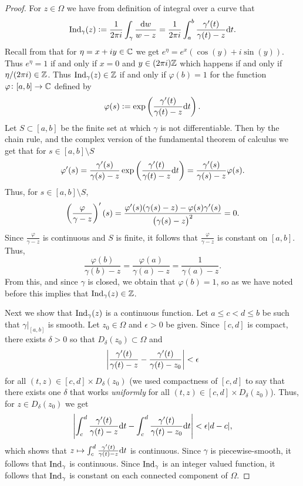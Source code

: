 \documentclass[11pt,a4paper]{article}
\begin{document}
\begin{proof}
  For $z \in \Omega$ we have from definition of integral over a curve
  that
  \[
    \operatorname{Ind}_{\gamma}(z) :=
    \frac{1}{2 \pi i} \int_{\gamma} \frac{\mathrm{d} w}{w - z} =
    \frac{1}{2 \pi i} \int_{a}^{b} \frac{\gamma'(t)}{\gamma(t) - z} \mathrm{d} t.
  \]
  Recall from  that
  for $\eta = x + iy \in \mathbb{C}$ we get $e^{\eta} = e^x (\cos(y) + i \sin(y))$.
  Thus  $e^{\eta} = 1$ if and only if $x = 0$ and $y \in (2\pi i)\mathbb{Z}$ 
  which happens if and only if $\eta / (2\pi i) \in \mathbb{Z}$.
  Thus $\operatorname{Ind}_{\gamma}(z) \in \mathbb{Z}$ if and only if $\varphi(b) = 1$
  for the function $\varphi \colon [a,b] \to \mathbb{C}$ defined by
  \[
    \varphi(s) := \exp\del{\frac{\gamma'(t)}{\gamma(t) - z} \dt}.
  \]
  Let $S \subset [a,b]$ be the finite set at which $\gamma$ is not
  differentiable.
  Then by the chain rule, and the complex version of the
  fundamental theorem of calculus we get that for $s \in [a,b] \setminus S$
  \[
    \varphi'(s) =
    \frac{\gamma'(s)}{\gamma(s) - z}
      \exp\del{\frac{\gamma'(t)}{\gamma(t) - z} \dt} =
    \frac{\gamma'(s)}{\gamma(s) - z} \varphi(s).
  \]
  Thus, for $s \in [a,b] \setminus S$,
  \[
    \del{\frac{\varphi}{\gamma - z}}'(s) =
    \frac{\varphi'(s)(\gamma(s) - z) - \varphi(s) \gamma'(s)}{\del{\gamma(s) - z}^2} = 0.
  \]
  Since $\frac{\varphi}{\gamma - z}$ is continuous and $S$ is finite,
  it follows that $\frac{\varphi}{\gamma - z}$ is constant on $[a,b]$.
  Thus,
  \[
    \frac{\varphi(b)}{\gamma(b) - z} =
    \frac{\varphi(a)}{\gamma(a) - z} =
    \frac{1}{\gamma(a) - z}.
  \]
  From this, and since $\gamma$ is closed, we obtain that $\varphi(b) = 1$,
  so as we have noted before this implies that $\operatorname{Ind}_{\gamma}(z) \in \mathbb{Z}$.

  Next we show that $\operatorname{Ind}_{\gamma}(z)$ is a continuous function.
  Let $a \le c < d \le b$ be such that $\gamma\vert_{[a,b]}$ is smooth.
  Let $z_0 \in \Omega$ and $\epsilon > 0$ be given.
  Since $[c,d]$ is compact, there exists $\delta > 0$ so that
  $D_{\delta}(z_0) \subset \Omega$ and
  \[
    \left\lvert\frac{\gamma'(t)}{\gamma(t) - z} - \frac{\gamma'(t)}{\gamma(t) - z_0}\right\rvert
    < \epsilon
  \]
  for all $(t,z) \in [c,d] \times D_{\delta}(z_0)$
  (we used compactness of $[c,d]$ to say that there exists one $\delta$
  that works \textit{uniformly}
  for all $(t,z) \in [c,d] \times D_{\delta}(z_0)$).
  Thus, for $z \in D_{\delta}(z_0)$ we get
  \[
    \left\lvert\int_{c}^{d} \frac{\gamma'(t)}{\gamma(t) - z} \mathrm{d} t -
    \int_{c}^{d} \frac{\gamma'(t)}{\gamma(t) - z_0} \mathrm{d} t\right\rvert < \epsilon |d - c|,
  \]
  which shows that $z \mapsto \int_{c}^{d} \frac{\gamma'(t)}{\gamma(t) - z} \mathrm{d} t$ is continuous.
  Since $\gamma$ is piecewise-smooth, it follows that $\operatorname{Ind}_{\gamma}$
  is continuous.
  Since $\operatorname{Ind}_{\gamma}$ is an integer valued function,
  it follows that $\operatorname{Ind}_{\gamma}$ is constant on each connected component of
  $\Omega$.


\end{proof}
\end{document}
